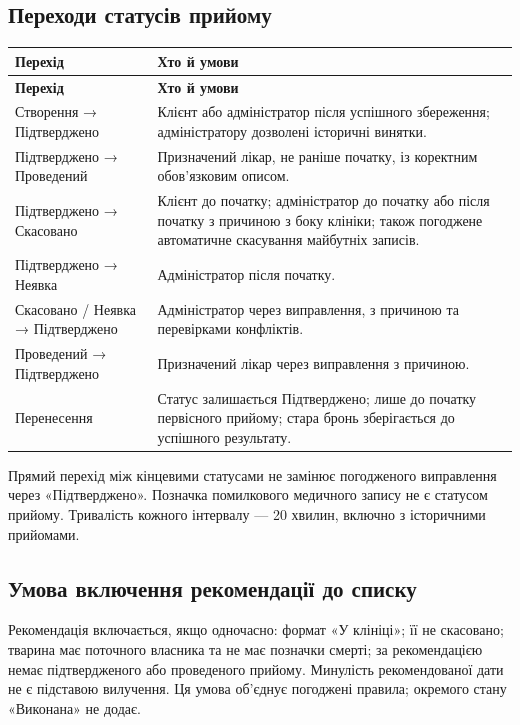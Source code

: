 \documentclass[11pt,a4paper]{article}
\begin{document}
\subsection{Переходи статусів прийому}
\begin{longtable}{>{\raggedright\arraybackslash}p{5cm} >{\raggedright\arraybackslash}p{10.6cm}}
\toprule
\textbf{Перехід} & \textbf{Хто й умови} \\ \midrule
\endfirsthead
\toprule
\textbf{Перехід} & \textbf{Хто й умови} \\ \midrule
\endhead
\bottomrule
\endfoot
Створення → Підтверджено & Клієнт або адміністратор після успішного збереження; адміністратору дозволені історичні винятки. \\
Підтверджено → Проведений & Призначений лікар, не раніше початку, із коректним обов’язковим описом. \\
Підтверджено → Скасовано & Клієнт до початку; адміністратор до початку або після початку з причиною з боку клініки; також погоджене автоматичне скасування майбутніх записів. \\
Підтверджено → Неявка & Адміністратор після початку. \\
Скасовано / Неявка → Підтверджено & Адміністратор через виправлення, з причиною та перевірками конфліктів. \\
Проведений → Підтверджено & Призначений лікар через виправлення з причиною. \\
Перенесення & Статус залишається Підтверджено; лише до початку первісного прийому; стара бронь зберігається до успішного результату. \\
\end{longtable}

Прямий перехід між кінцевими статусами не замінює погодженого виправлення через «Підтверджено». Позначка помилкового медичного запису не є статусом прийому. Тривалість кожного інтервалу — 20 хвилин, включно з історичними прийомами.

\subsection{Умова включення рекомендації до списку}
Рекомендація включається, якщо одночасно: формат «У клініці»; її не скасовано; тварина має поточного власника та не має позначки смерті; за рекомендацією немає підтвердженого або проведеного прийому. Минулість рекомендованої дати не є підставою вилучення. Ця умова об’єднує погоджені правила; окремого стану «Виконана» не додає.
\end{document}
